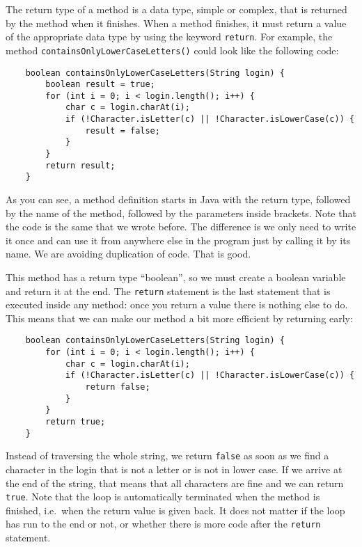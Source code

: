 The return type of a method is a data type, simple or complex, that is
returned by the method when it finishes. When a method finishes, it
must return a value of the appropriate data type by using the keyword
\verb+return+. For example, the method
\verb+containsOnlyLowerCaseLetters()+ could look 
like the following code:

\begin{verbatim}
    boolean containsOnlyLowerCaseLetters(String login) {
        boolean result = true;
        for (int i = 0; i < login.length(); i++) {
            char c = login.charAt(i);
            if (!Character.isLetter(c) || !Character.isLowerCase(c)) {
                result = false;
            }
        }
        return result;
    }
\end{verbatim}

As you can see, a method definition starts in Java with the return
type, followed by the name of the method, followed by the parameters
inside brackets. 
Note that the code is the same that we wrote before. The difference is
we only need to write it once and can use it from anywhere else in the
program just by calling it by its name. 
We are avoiding duplication of code. That is good. 

This method has a return type ``boolean'', so we
must create a boolean variable and return it at the end. The \verb+return+
statement is the last statement that is executed inside any method:
once you return a value there is nothing else to do. This means
that we can make our method a bit more efficient by returning early: 

\begin{verbatim}
    boolean containsOnlyLowerCaseLetters(String login) {
        for (int i = 0; i < login.length(); i++) {
            char c = login.charAt(i);
            if (!Character.isLetter(c) || !Character.isLowerCase(c)) {
                return false;
            }
        }
        return true;
    }
\end{verbatim}

Instead of traversing the whole string, we return \verb+false+ as soon
as we find a character in the login that is not a letter or is not
in lower case. If we arrive at the end of the string, that means that
all characters are fine and we can return \verb+true+. Note that the
loop is automatically terminated when the method is finished,
i.e.~when the return value is given back. It does not matter if the
loop has run to the end or not, or whether there is more code after
the \verb+return+ statement. 

